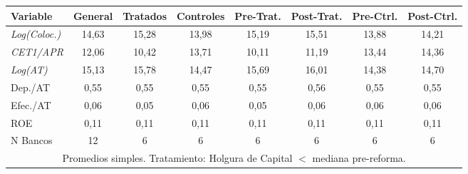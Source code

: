 \begin{center}
\scriptsize
\renewcommand{\arraystretch}{1.1}
\begin{tabular}{lccccccc}
\hline
Variable & General & Tratados & Controles & Pre-Trat. & Post-Trat. & Pre-Ctrl. & Post-Ctrl. \\
\hline\hline
\textit{Log(Coloc.)} & 14,63 & 15,28 & 13,98 & 15,19 & 15,51 & 13,88 & 14,21
\\
\textit{CET1/APR} & 12,06 & 10,42 & 13,71 & 10,11 & 11,19 & 13,44 & 14,36
\\
\textit{Log(AT)} & 15,13 & 15,78 & 14,47 & 15,69 & 16,01 & 14,38 & 14,70
\\
Dep./AT & 0,55 & 0,55 & 0,55 & 0,55 & 0,56 & 0,55 & 0,55
\\
Efec./AT & 0,06 & 0,05 & 0,06 & 0,05 & 0,06 & 0,06 & 0,06
\\
ROE & 0,11 & 0,11 & 0,11 & 0,11 & 0,11 & 0,11 & 0,11
\\
N Bancos & 12 & 6 & 6 & 6 & 6 & 6 & 6
\\
\hline
\multicolumn{8}{c}{\tiny Promedios simples. Tratamiento: Holgura de Capital $<$ mediana pre-reforma.}\\
\hline
\end{tabular}
\end{center}
